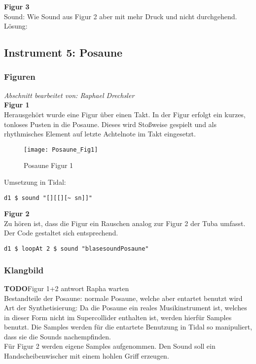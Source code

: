 \documentclass[
10pt, %
a4paper, %
oneside, %
headinclude,footinclude, %
BCOR5mm, %
]{scrartcl}
\begin{document}
\noindent\textbf{Figur 3}\\
Sound: Wie Sound aus Figur 2 aber mit mehr Druck und nicht durchgehend.\\
Lösung:\\


\subsection{Instrument 5: Posaune}
\subsubsection{Figuren}
\textit{Abschnitt bearbeitet von: Raphael Drechsler}\\

\noindent\textbf{Figur 1}\\
Herausgehört wurde eine Figur über einen Takt. In der Figur erfolgt ein kurzes, tonloses Pusten in die Posaune. Dieses wird Stoßweise gespielt und als rhythmisches Element auf letzte Achtelnote im Takt eingesetzt.\\
\begin{figure}[h]
	\centering 
	\texttt{[image: Posaune\_Fig1]} 
	\caption{Posaune Figur 1}
\end{figure}

\noindent Umsetzung in Tidal:
\begin{lstlisting}
d1 $ sound "[][[][~ sn]]"
\end{lstlisting}


\noindent\textbf{Figur 2}\\
Zu hören ist, dass die Figur ein Rauschen analog zur Figur 2 der Tuba umfasst. Der Code gestaltet sich entsprechend.
\begin{lstlisting}
d1 $ loopAt 2 $ sound "blasesoundPosaune"
\end{lstlisting}

\subsubsection{Klangbild}
{\color{red}\textbf{TODO}}Figur 1+2 antwort Rapha warten\\
Bestandteile der Posaune: normale Posaune, welche aber entartet benutzt wird\\
Art der Synthetisierung: Da die Posaune ein reales Musikinstrument ist, welches in dieser Form nicht im Supercollider enthalten ist,
werden hierfür Samples benutzt. Die Samples werden für die entartete Benutzung in Tidal so manipuliert, dass sie die Sounds
nachempfinden.\\
Für Figur 2 werden eigene Samples aufgenommen. Den Sound soll ein Handscheibenwischer mit einem hohlen Griff erzeugen.
\end{document}
